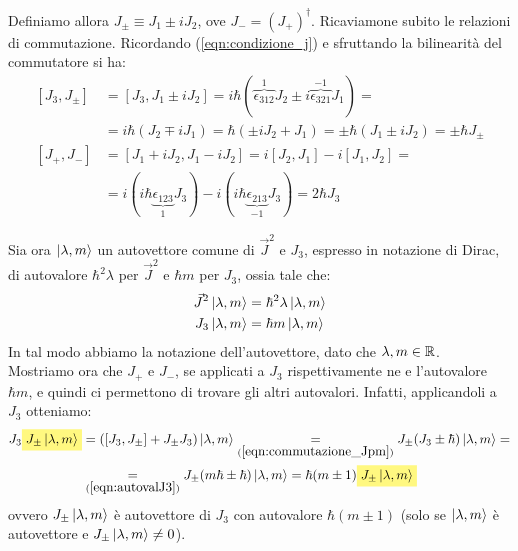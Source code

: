 \documentclass[../../FisicaTeorica.tex]{subfiles}
\begin{document}
Definiamo allora $J_{\pm} \equiv J_1 \pm i J_2$, ove $J_- = (J_+)^\dag$. Ricaviamone subito le relazioni di commutazione. Ricordando (\ref{eqn:condizione_j}) e sfruttando la bilinearità del commutatore si ha:
\begin{align}\nonumber
[J_3, J_{\pm}] &= [J_3, J_1 \pm i J_2] = i\hbar (\overbrace{\epsilon_{312}}^{1} J_2 \pm i\overbrace{ \epsilon_{321}}^{-1}J_1) =\\
&=i\hbar (J_2 \mp iJ_1) = \hbar (\pm i J_2 + J_1) = \pm \hbar(J_1 \pm i J_2) = \pm \hbar J_\pm
\label{eqn:commutazione_Jpm}
\\
[J_+, J_-] &= [J_1 + iJ_2, J_1 - iJ_2]=i[J_2, J_1]-i[J_1,J_2]=\\
&= i(i\hbar\underbrace{\epsilon_{123}}_{1}J_3) -i(i\hbar\underbrace{ \epsilon_{213}}_{-1}J_3)=
2\hbar J_3 \nonumber
\end{align}

Sia ora $\Ket{\lambda,m}$ un autovettore comune di $\vec{J}^2$ e $J_3$, espresso in notazione di Dirac, di autovalore $\hbar^2 \lambda$ per $\vec{J}^2$ e $\hbar m$ per $J_3$, ossia tale che:
\begin{align}
\vec{J}^2 \Ket{\lambda,m} &= \hbar^2 \lambda \Ket{\lambda,m}
\label{eqn:autovalJquadro}
\\
J_3 \Ket{\lambda,m} &=\hbar m \Ket{\lambda,m} 
\label{eqn:autovalJ3}
\end{align}
In tal modo abbiamo  la notazione dell'autovettore, dato che $\lambda, m \in \mathbb{R}$.\\
Mostriamo ora che $J_+$ e $J_-$, se applicati a $J_3$ rispettivamente ne  e  l'autovalore $\hbar m$, e quindi ci permettono di trovare gli altri autovalori. Infatti, applicandoli a $J_3$ otteniamo:
\begin{align}\nonumber
J_3 \hlc{Yellow}{J_{\pm} \ket{\lambda,m}} &= ([J_3,J_\pm]+J_\pm J_3)\ket{\lambda,m} \underset{(\ref{eqn:commutazione_Jpm})}{=}
J_\pm (J_3 \pm \hbar) \ket{\lambda, m} = \\
&\underset{(\ref{eqn:autovalJ3})}{=} J_\pm (m\hbar \pm \hbar) \ket{\lambda,m} = \hbar(m\pm 1)\hlc{Yellow}{ J_{\pm}\ket{\lambda,m}} \label{eqn:autovalore_aumentato}
\end{align}
ovvero $J_\pm\Ket{\lambda,m}$ è autovettore di $J_3$ con autovalore $\hbar(m\pm 1)$ (solo se $\Ket{\lambda,m}$ è autovettore e $J_\pm \Ket{\lambda,m}\neq 0$).\\ %
\end{document}
